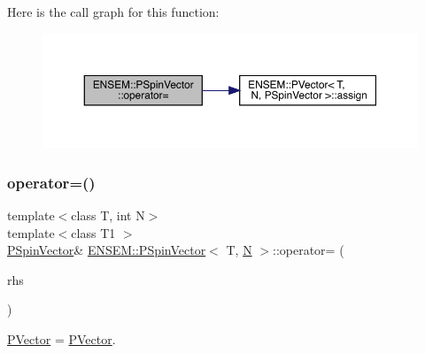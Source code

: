 Here is the call graph for this function\+:
\nopagebreak
\begin{figure}[H]
\begin{center}
\leavevmode
\includegraphics[width=350pt]{d0/dce/classENSEM_1_1PSpinVector_aff99857da5f6f68093f04c9df5355e84_cgraph}
\end{center}
\end{figure}
\mbox{\label{classENSEM_1_1PSpinVector_a6c7a984a7ab5ad8939e0a9bc57a93660}} 
\subsubsection{\texorpdfstring{operator=()}{operator=()}\hspace{0.1cm}{\footnotesize\ttfamily [3/4]}}
{\footnotesize\ttfamily template$<$class T, int N$>$ \\
template$<$class T1 $>$ \\
\mbox{\hyperlink{classENSEM_1_1PSpinVector}{P\+Spin\+Vector}}\& \mbox{\hyperlink{classENSEM_1_1PSpinVector}{E\+N\+S\+E\+M\+::\+P\+Spin\+Vector}}$<$ T, \mbox{\hyperlink{operator__name__util_8cc_a7722c8ecbb62d99aee7ce68b1752f337}{N}} $>$\+::operator= (\begin{DoxyParamCaption}\item[{const \mbox{\hyperlink{classENSEM_1_1PSpinVector}{P\+Spin\+Vector}}$<$ T1, \mbox{\hyperlink{operator__name__util_8cc_a7722c8ecbb62d99aee7ce68b1752f337}{N}} $>$ \&}]{rhs }\end{DoxyParamCaption})\hspace{0.3cm}{\ttfamily [inline]}}



\mbox{\hyperlink{classENSEM_1_1PVector}{P\+Vector}} = \mbox{\hyperlink{classENSEM_1_1PVector}{P\+Vector}}. 

